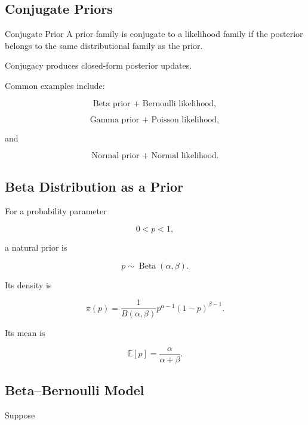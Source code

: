 \subsection{Conjugate Priors}
\label{subsec:conjugate-priors}

\begin{definitionbox}{Conjugate Prior}
A prior family is conjugate to a likelihood family if the posterior
belongs to the same distributional family as the prior.
\end{definitionbox}

Conjugacy produces closed-form posterior updates.

Common examples include:

\[
\boxed{
\text{Beta prior + Bernoulli likelihood},
}
\]

\[
\boxed{
\text{Gamma prior + Poisson likelihood},
}
\]

and

\[
\boxed{
\text{Normal prior + Normal likelihood}.
}
\]

\subsection{Beta Distribution as a Prior}
\label{subsec:beta-prior}

For a probability parameter

\[
0<p<1,
\]

a natural prior is

\[
\boxed{
p
\sim
\operatorname{Beta}(\alpha,\beta).
}
\]

Its density is

\[
\boxed{
\pi(p)
=
\frac1{B(\alpha,\beta)}
p^{\alpha-1}
(1-p)^{\beta-1}.
}
\]

Its mean is

\[
\boxed{
\mathbb{E}[p]
=
\frac{\alpha}{\alpha+\beta}.
}
\]

\subsection{Beta--Bernoulli Model}
\label{subsec:beta-bernoulli}

Suppose

